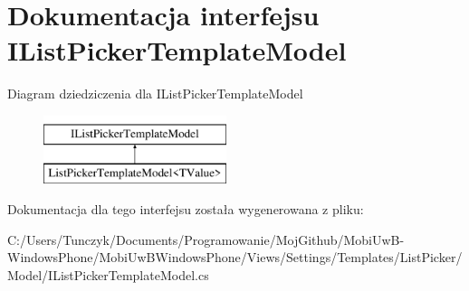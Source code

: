 \hypertarget{a00024}{}\section{Dokumentacja interfejsu I\+List\+Picker\+Template\+Model}
\label{a00024}
Diagram dziedziczenia dla I\+List\+Picker\+Template\+Model\begin{figure}[H]
\begin{center}
\leavevmode
\includegraphics[height=2.000000cm]{dc/de2/a00024}
\end{center}
\end{figure}


Dokumentacja dla tego interfejsu została wygenerowana z pliku\+:\begin{DoxyCompactItemize}
\item 
C\+:/\+Users/\+Tunczyk/\+Documents/\+Programowanie/\+Moj\+Github/\+Mobi\+Uw\+B-\/\+Windows\+Phone/\+Mobi\+Uw\+B\+Windows\+Phone/\+Views/\+Settings/\+Templates/\+List\+Picker/\+Model/I\+List\+Picker\+Template\+Model.\+cs\end{DoxyCompactItemize}
